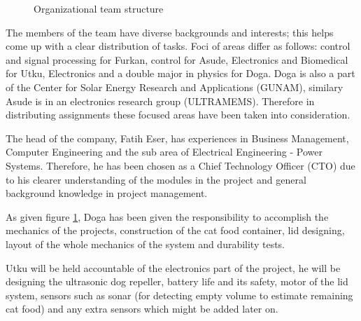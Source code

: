\begin{figure}[htp]

\caption{Organizational team structure}
\label{fig:organizational_structure}
\end{figure}

The members of the team have diverse backgrounds and interests; this helps come up with a clear distribution of tasks. Foci of areas differ as follows: control and signal processing for Furkan, control for Asude, Electronics and Biomedical for Utku, Electronics and a double major in physics for Doga. Doga is also a part of the Center for Solar Energy Research and Applications (GUNAM), similary Asude is in an electronics research group (ULTRAMEMS). Therefore in distributing assignments these focused areas have been taken into consideration. 

The head of the company, Fatih Eser, has experiences in Business Management, Computer Engineering and the sub area of Electrical Engineering - Power Systems. Therefore, he has been chosen as a Chief Technology Officer (CTO) due to his clearer understanding of the modules in the project and general background knowledge in project management. 

As given figure \ref{fig:organizational_structure}, Doga has been given the responsibility to accomplish the mechanics of the projects, construction of the cat food container, lid designing, layout of the whole mechanics of the system and durability tests. 

Utku will be held accountable of the electronics part of the project, he will be designing the ultrasonic dog repeller, battery life and its safety, motor of the lid system, sensors such as sonar (for detecting empty volume to estimate remaining cat food) and any extra sensors which might be added later on. 

